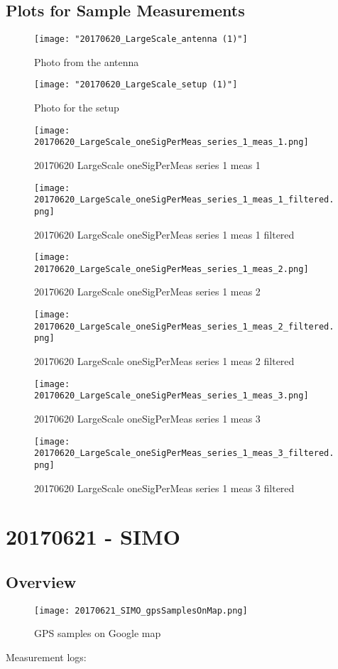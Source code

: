 \subsection{Plots for Sample Measurements}
\begin{figure}[ht] \caption{Photo from the antenna}
\texttt{[image: "20170620\_LargeScale\_antenna (1)"]}\centering\end{figure}
\begin{figure}[ht] \caption{Photo for the setup}
\texttt{[image: "20170620\_LargeScale\_setup (1)"]}\centering\end{figure}
\begin{figure}[ht] \caption{20170620 LargeScale oneSigPerMeas series 1 meas 1}
\texttt{[image: 20170620\_LargeScale\_oneSigPerMeas\_series\_1\_meas\_1.png]}\centering\end{figure}
\begin{figure}[ht] \caption{20170620 LargeScale oneSigPerMeas series 1 meas 1 filtered}
\texttt{[image: 20170620\_LargeScale\_oneSigPerMeas\_series\_1\_meas\_1\_filtered.png]}\centering\end{figure}
\begin{figure}[ht] \caption{20170620 LargeScale oneSigPerMeas series 1 meas 2}
\texttt{[image: 20170620\_LargeScale\_oneSigPerMeas\_series\_1\_meas\_2.png]}\centering\end{figure}
\begin{figure}[ht] \caption{20170620 LargeScale oneSigPerMeas series 1 meas 2 filtered}
\texttt{[image: 20170620\_LargeScale\_oneSigPerMeas\_series\_1\_meas\_2\_filtered.png]}\centering\end{figure}
\begin{figure}[ht] \caption{20170620 LargeScale oneSigPerMeas series 1 meas 3}
\texttt{[image: 20170620\_LargeScale\_oneSigPerMeas\_series\_1\_meas\_3.png]}\centering\end{figure}
\begin{figure}[ht] \caption{20170620 LargeScale oneSigPerMeas series 1 meas 3 filtered}
\texttt{[image: 20170620\_LargeScale\_oneSigPerMeas\_series\_1\_meas\_3\_filtered.png]}\centering\end{figure}
\clearpage
\section{20170621 - SIMO}
\subsection{Overview}
\begin{figure}[ht] \caption{GPS samples on Google map}
\texttt{[image: 20170621\_SIMO\_gpsSamplesOnMap.png]}\centering\end{figure}
\begin{minipage}{\textwidth} Measurement logs:

 \end{minipage}
\clearpage
